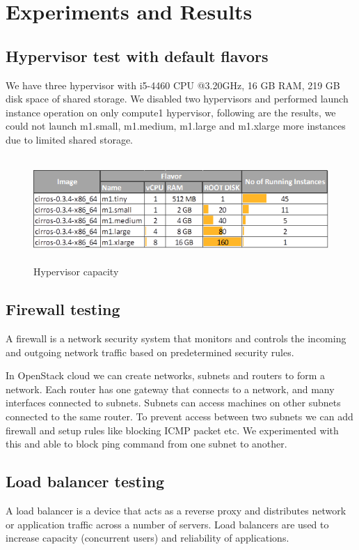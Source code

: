 \chapter{Experiments and Results}
\section{Hypervisor test with default flavors}

We have three hypervisor with i5-4460 CPU @3.20GHz, 16 GB RAM, 219 GB disk space of shared storage. We disabled two hypervisors and performed launch instance operation on only compute1 hypervisor, following are the results, we could not launch m1.small, m1.medium, m1.large and m1.xlarge more instances due to limited shared storage.

\begin{figure}[h]
    \centering
    \includegraphics[width=14cm,height=4cm]{images/default_flavor2.png}
    \caption{Hypervisor capacity}
\end{figure}

\section{Firewall testing}
    \par A firewall is a network security system that monitors and controls the incoming and outgoing network traffic based on predetermined security rules.
    
    \par In OpenStack cloud we can create networks, subnets and routers to form a network. Each router has one gateway that connects to a network, and many interfaces connected to subnets. Subnets can access machines on other subnets connected to the same router. To prevent access between two subnets we can add firewall and setup rules like blocking ICMP packet etc. We experimented with this and able to block ping command from one subnet to another.
    
\section{Load balancer testing}
    \par A load balancer is a device that acts as a reverse proxy and distributes network or application traffic across a number of servers. Load balancers are used to increase capacity (concurrent users) and reliability of applications.
    

